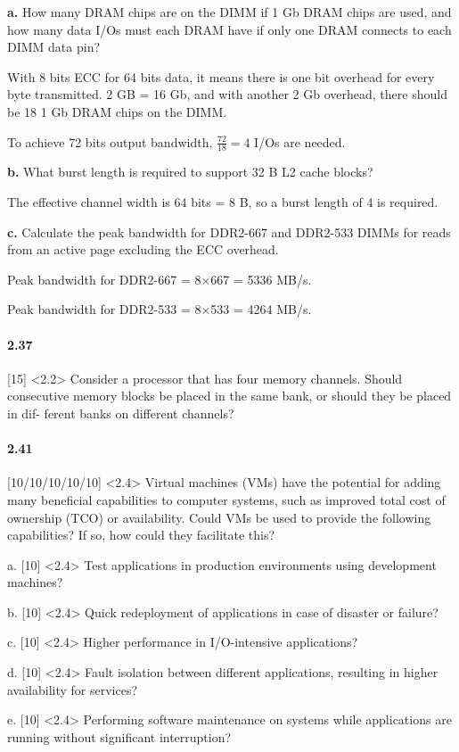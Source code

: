 \documentclass{article}
\begin{document}
\textbf{a.} How many DRAM chips are on the DIMM if 1 Gb DRAM chips are used, and how many data I/Os must each DRAM have if only one DRAM connects to each DIMM data pin?

With 8 bits ECC for 64 bits data, it means there is one bit overhead for every byte transmitted. 2 GB = 16 Gb, and with another 2 Gb overhead, there should be 18 1 Gb DRAM chips on the DIMM.

To achieve 72 bits output bandwidth, $\frac{72}{18}=4$ I/Os are needed.

\textbf{b.} What burst length is required to support 32 B L2 cache blocks?

The effective channel width is 64 bits = 8 B, so a burst length of 4 is required.

\textbf{c.} Calculate the peak bandwidth for DDR2-667 and DDR2-533 DIMMs for reads from an active page excluding the ECC overhead.

Peak bandwidth for DDR2-667 = 8$\times$667 = 5336 MB/s.

Peak bandwidth for DDR2-533 = 8$\times$533 = 4264 MB/s.




\paragraph{2.37} [15] <2.2> Consider a processor that has four memory channels. Should consecutive memory blocks be placed in the same bank, or should they be placed in dif- ferent banks on different channels?

\paragraph{2.41} [10/10/10/10/10] <2.4> Virtual machines (VMs) have the potential for adding many beneficial capabilities to computer systems, such as improved total cost of ownership (TCO) or availability. Could VMs be used to provide the following capabilities? If so, how could they facilitate this?

a. [10] <2.4> Test applications in production environments using development machines?

b. [10] <2.4> Quick redeployment of applications in case of disaster or failure?

c. [10] <2.4> Higher performance in I/O-intensive applications?

d. [10] <2.4> Fault isolation between different applications, resulting in higher availability for services?

e. [10] <2.4> Performing software maintenance on systems while applications are running without significant interruption?
\end{document}
